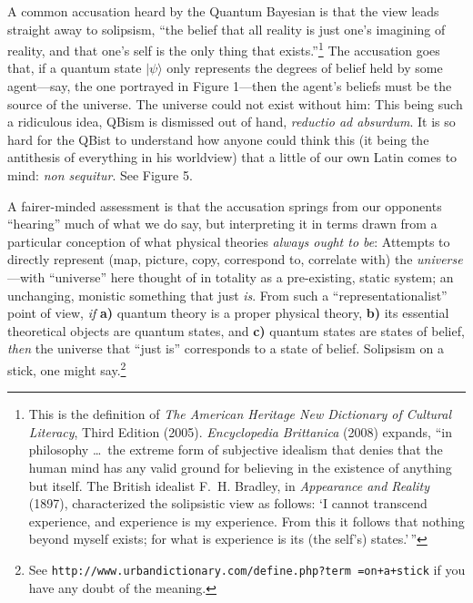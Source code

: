 A common accusation heard by the Quantum Bayesian is that the view leads straight away to solipsism, ``the belief that all reality is just one's  imagining of reality, and that one's self is the only thing that exists.''\footnote{This is the definition of {\sl The American Heritage New Dictionary of Cultural Literacy}, Third Edition (2005).  {\sl Encyclopedia Brittanica\/} (2008) expands, ``in philosophy \ldots\ the extreme form of subjective idealism that denies that the human mind has any valid ground for believing in the existence of anything but itself. The British idealist F.~H. Bradley, in {\sl Appearance and Reality\/} (1897), characterized the solipsistic view as follows: `I cannot transcend experience, and experience is my experience. From this it follows that nothing beyond myself exists; for what is experience is its (the self's) states.'$\,$''}  The accusation goes that, if a quantum state $|\psi\rangle$ only represents the degrees of belief held by some agent---say, the one portrayed in Figure 1---then the agent's beliefs must be the source of the universe.  The universe could not exist without him: This being such a ridiculous idea, QBism is dismissed out of hand, {\it reductio ad absurdum}.  It is so hard for the QBist to understand how anyone could think this (it being the antithesis of everything in his worldview) that a little of our own Latin comes to mind: {\it non sequitur}.  See Figure 5.

A fairer-minded assessment is that the accusation springs from our opponents ``hearing'' much of what we do say, but interpreting it in terms drawn from a particular conception of what physical theories {\it always ought to be}:  Attempts to directly represent (map, picture, copy, correspond to, correlate with) the {\it universe}---with ``universe'' here thought of in totality as a pre-existing, static system; an unchanging, monistic something that just {\it is}.  From such a ``representationalist'' point of view, {\it if\/} {\bf a)} quantum theory is a proper physical theory, {\bf b)} its essential theoretical objects are quantum states, and {\bf c)} quantum states are states of belief, {\it then\/} the universe that ``just is'' corresponds to a state of belief.  Solipsism on a stick, one might say.\footnote{See {\tt http://www.urbandictionary.com/define.php?term =on+a+stick\/} if you have any doubt of the meaning.}

